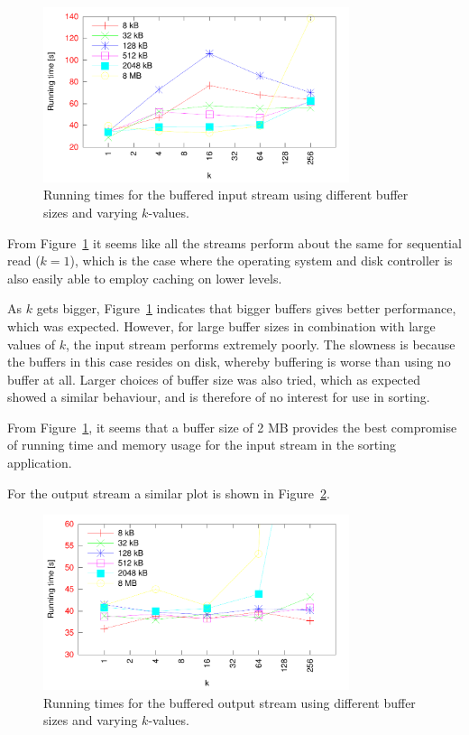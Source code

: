 \documentclass[a4paper,12pt]{article}
\begin{document}
\begin{figure}[h!]
  \centering
  \includegraphics[width=0.8\textwidth]{buffered_input_low}
  \caption{Running times for the buffered input stream using different
    buffer sizes and varying $k$-values.}
  \label{fig:buffered-input}
\end{figure}

From Figure~\ref{fig:buffered-input} it seems like all the streams
perform about the same for sequential read ($k = 1$), which is the
case where the operating system and disk controller is also easily
able to employ caching on lower levels.

As $k$ gets bigger, Figure~\ref{fig:buffered-input} indicates that
bigger buffers gives better performance, which was expected. However,
for large buffer sizes in combination with large values of $k$, the
input stream performs extremely poorly. The slowness is because the
buffers in this case resides on disk, whereby buffering is worse than
using no buffer at all. Larger choices of buffer size was also tried,
which as expected showed a similar behaviour, and is therefore of no
interest for use in sorting.

From Figure~\ref{fig:buffered-input}, it seems that a buffer size of 2
MB provides the best compromise of running time and memory usage for
the input stream in the sorting application.

For the output stream a similar plot is shown in
Figure~\ref{fig:buffered-output}.

\begin{figure}[h!]
  \centering
  \includegraphics[width=0.8\textwidth]{buffered_output_low}
  \caption{Running times for the buffered output stream using different
    buffer sizes and varying $k$-values.}
  \label{fig:buffered-output}
\end{figure}
\end{document}
